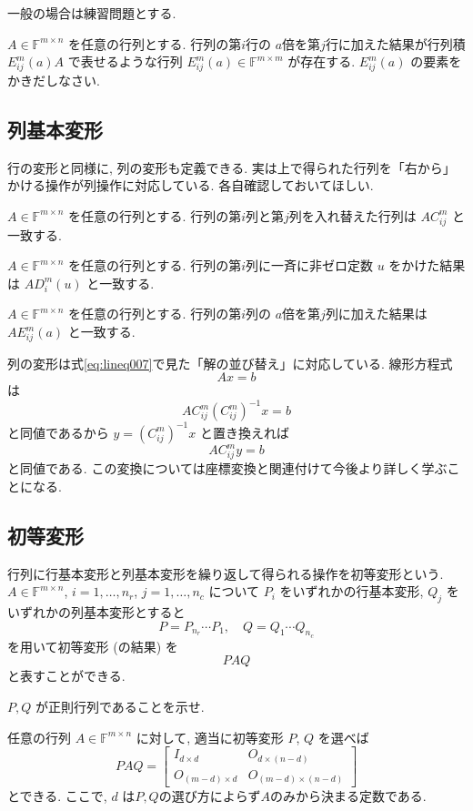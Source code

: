 \documentclass[a4paper]{scrbook}
\theoremstyle{definition}
\let\BeginKnitrBlock\begin \let\EndKnitrBlock\end
\begin{document}
一般の場合は練習問題とする.

\BeginKnitrBlock{exercise}
\(A\in\mathbb{F}^{m\times n}\) を任意の行列とする. 行列の第\(i\)行の
\(a\)倍を第\(j\)行に加えた結果が行列積 \(E_{ij}^{m}(a)A\)
で表せるような行列 \(E_{ij}^{m}(a)\in\mathbb{F}^{m\times m}\)
が存在する. \(E_{ij}^{m}(a)\) の要素をかきだしなさい.
\EndKnitrBlock{exercise}

\subsection{列基本変形}

行の変形と同様に, 列の変形も定義できる.
実は上で得られた行列を「右から」かける操作が列操作に対応している.
各自確認しておいてほしい.

\BeginKnitrBlock{exercise}
\(A\in\mathbb{F}^{m\times n}\) を任意の行列とする.
行列の第\(i\)列と第\(j\)列を入れ替えた行列は \(AC_{ij}^{m}\) と一致する.
\EndKnitrBlock{exercise}

\BeginKnitrBlock{exercise}
\(A\in\mathbb{F}^{m\times n}\) を任意の行列とする.
行列の第\(i\)列に一斉に非ゼロ定数 \(u\) をかけた結果は \(AD_{i}^{m}(u)\)
と一致する.
\EndKnitrBlock{exercise}

\BeginKnitrBlock{exercise}
\(A\in\mathbb{F}^{m\times n}\) を任意の行列とする. 行列の第\(i\)列の
\(a\)倍を第\(j\)列に加えた結果は \(AE_{ij}^{m}(a)\) と一致する.
\EndKnitrBlock{exercise}

列の変形は式\eqref{eq:lineq007}で見た「解の並び替え」に対応している.
線形方程式 \[
Ax=b
\] は \[
AC_{ij}^{m}\left(C_{ij}^{m}\right)^{-1}x=b
\] と同値であるから \(y=\left(C_{ij}^{m}\right)^{-1}x\) と置き換えれば
\[
AC_{ij}^{m}y=b
\] と同値である.
この変換については座標変換と関連付けて今後より詳しく学ぶことになる.

\subsection{初等変形}

行列に行基本変形と列基本変形を繰り返して得られる操作を初等変形という.
\(A\in\mathbb{F}^{m\times n}\), \(i=1,\dots,n_{r}\), \(j=1,\dots,n_{c}\)
について \(P_{i}\) をいずれかの行基本変形, \(Q_{j}\)
をいずれかの列基本変形とすると \[
P=P_{n_{r}}\cdots P_{1},\quad Q=Q_{1}\cdots Q_{n_{c}}
\] を用いて初等変形 (の結果) を \[
PAQ
\] と表すことができる.

\BeginKnitrBlock{exercise}
\(P,Q\) が正則行列であることを示せ.
\EndKnitrBlock{exercise}

\BeginKnitrBlock{proposition}
\protect\hypertarget{prp:unnamed-chunk-49}{}{\label{prp:unnamed-chunk-49}}任意の行列
\(A\in\mathbb{F}^{m\times n}\) に対して, 適当に初等変形 \(P\), \(Q\)
を選べば \[
  PAQ=\left[\begin{array}{c|c}
  I_{d\times d} & O_{d\times(n-d)}\\
  \hline O_{(m-d)\times d} & O_{(m-d)\times(n-d)}
  \end{array}\right]
\] とできる. ここで, \(d\)
は\(P,Q\)の選び方によらず\(A\)のみから決まる定数である.
\EndKnitrBlock{proposition}
\end{document}
